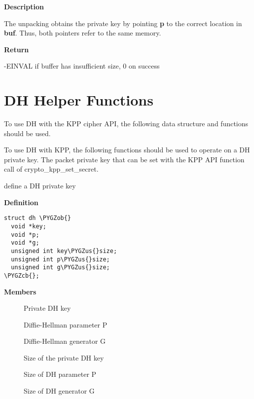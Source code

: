 \documentclass[a4paper,8pt,english]{sphinxmanual}
\def\PYGZus{\char`\_}
\def\PYGZob{\char`\{}
\def\PYGZcb{\char`\}}
\begin{document}
\textbf{Description}

The unpacking obtains the private key by pointing \textbf{p} to the correct location
in \textbf{buf}. Thus, both pointers refer to the same memory.

\textbf{Return}

-EINVAL if buffer has insufficient size, 0 on success


\section{DH Helper Functions}
\label{crypto/api-kpp:dh-helper-functions}
To use DH with the KPP cipher API, the following data structure and
functions should be used.

To use DH with KPP, the following functions should be used to operate on
a DH private key. The packet private key that can be set with
the KPP API function call of crypto\_kpp\_set\_secret.

\begin{fulllineitems}
\label{crypto/api-kpp:c.dh}
define a DH private key

\end{fulllineitems}


\textbf{Definition}

\begin{Verbatim}[commandchars=\\\{\}]
struct dh \PYGZob{}
  void *key;
  void *p;
  void *g;
  unsigned int key\PYGZus{}size;
  unsigned int p\PYGZus{}size;
  unsigned int g\PYGZus{}size;
\PYGZcb{};
\end{Verbatim}

\textbf{Members}
\begin{description}
\item[{}] \leavevmode
Private DH key

\item[{}] \leavevmode
Diffie-Hellman parameter P

\item[{}] \leavevmode
Diffie-Hellman generator G

\item[{}] \leavevmode
Size of the private DH key

\item[{}] \leavevmode
Size of DH parameter P

\item[{}] \leavevmode
Size of DH generator G

\end{description}
\end{document}
